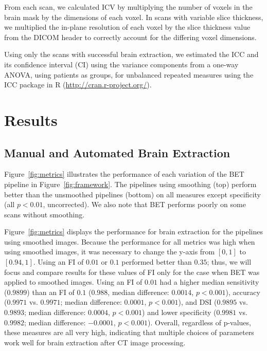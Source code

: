 \documentclass{elsarticle}\usepackage[]{graphicx}\usepackage[]{color}
\begin{document}
From each scan, we calculated ICV by multiplying the number of voxels in the brain mask by the dimensions of each voxel.  In scans with variable slice thickness, we multiplied the in-plane resolution of each voxel by the slice thickness value from the DICOM header to correctly account for the differing voxel dimensions.  

Using only the scans with successful brain extraction, we estimated the ICC and its confidence interval (CI) using the variance components from a one-way ANOVA, using patients as groups, for unbalanced repeated measures \citep{searle_linear_2012, thomas_interval_1978, donner_use_1979, lessells_unrepeatable_1987} using the ICC package \citep{wolak_guidelines_2012} in R (\url{http://cran.r-project.org/}).  




\section{Results}
\subsection{Manual and Automated Brain Extraction}
Figure~\ref{fig:metrics}\protect{} illustrates the performance of each variation of the BET pipeline in Figure~\ref{fig:framework}.  The pipelines using smoothing (top) perform better than the unsmoothed pipelines (bottom) on all measures except specificity (all $p < 0.01$, uncorrected).  We also note that BET performs poorly on some scans without smoothing.  

Figure~\ref{fig:metrics}\protect{} displays the performance for brain extraction for the pipelines using smoothed images.   Because the performance for all metrics was high when using smoothed images, it was necessary to change the y-axis from $[0,1]$ to $[0.94,1]$. 
Using an FI of $0.01$ or $0.1$ performed better than $0.35$; thus, we will focus and compare results for these values of FI only for the case when BET was applied to smoothed images.  Using an FI of $0.01$ had a higher median sensitivity ($0.9899$) than an FI of $0.1$ ($0.988$, median difference: $0.0014$, $p< 0.001$), accuracy ($0.9971$ vs. $0.9971$; median difference: $0.0001$, $p< 0.001$), and DSI ($0.9895$ vs. $0.9893$; median difference: $0.0004$, $p< 0.001$) and lower specificity ($0.9981$ vs. $0.9982$; median difference: $-0.0001$, $p< 0.001$).  Overall, regardless of p-values, these measures are all very high, indicating that multiple choices of parameters work well for brain extraction after CT image processing.
\end{document}
